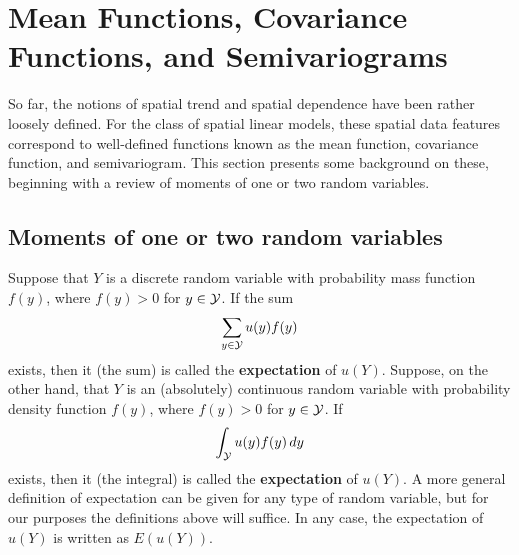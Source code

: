
\section{Mean Functions, Covariance Functions, and Semivariograms}
So far, the notions of spatial trend and spatial dependence have been rather loosely defined.  For the class of spatial linear models, these spatial data features correspond to well-defined functions known as the mean function, covariance function, and semivariogram.  This section presents some background on these, beginning with a review of moments of one or two random variables. 

\subsection{Moments of one or two random variables}
Suppose that $Y$ is a discrete random variable with probability mass function $f(y)$, where $f(y)>0$ for $y\in{\cal Y}$.  If the sum
\begin{equation}\label{Ediscrete}
\sum_{y\in{\cal Y}}u(y)f(y)
\end{equation}
exists, then it (the sum) is called the {\bf expectation} of $u(Y)$.  Suppose, on the other hand, that
$Y$ is an (absolutely) continuous random variable with probability density function $f(y)$, where $f(y)>0$ for $y\in{\cal Y}$.  If
\begin{equation}\label{Econtinuous}
\int_{\cal Y}u(y)f(y)\,dy
\end{equation}
exists, then it (the integral) is called the {\bf expectation} of $u(Y)$.  A more general definition of expectation can be given for any type of random variable, but for our purposes the definitions above will suffice.  In any case, the expectation of $u(Y)$ is written as $E(u(Y))$.

